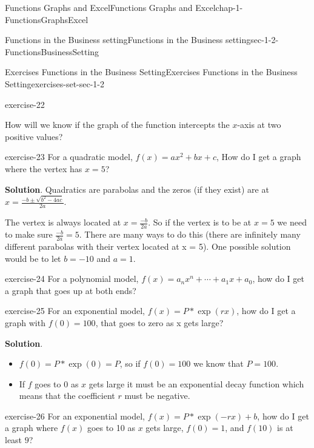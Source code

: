 \documentclass[oneside,10pt,]{book}
\numberwithin{equation}{section}
\begin{document}
\begin{chapterptx}{Functions Graphs and Excel}{}{Functions Graphs and Excel}{}{}{chap-1-FunctionsGraphsExcel}
\begin{sectionptx}{Functions in the Business setting}{}{Functions in the Business setting}{}{}{sec-1-2-FunctionsBusinessSetting}
\begin{exercises-subsection-numberless}{Exercises  Functions in the Business Setting}{}{Exercises  Functions in the Business Setting}{}{}{exercises-set-sec-1-2}
\begin{divisionexercise}{2}{}{}{exercise-22}
\begin{enumerate}[label=(\alph*)]
How will we know if the graph of the function intercepts the \(x\)-axis at two positive values?%
\end{enumerate}
%
\end{divisionexercise}%
\begin{divisionexercise}{3}{}{}{exercise-23}%
\hypertarget{p-179}{}%
For a quadratic model, \(f(x)=a x^2+b x+c\), How do I get a graph where the vertex has \(x=5\)?%
\par\smallskip%
\noindent\textbf{Solution}.\hypertarget{solution-12}{}\quad%
\hypertarget{p-180}{}%
Quadratics are parabolas and the zeros (if they exist) are at \(x=  \frac{-b\pm \sqrt{b^2-4ac}}{2a}\).%
\par
\hypertarget{p-181}{}%
The vertex is always located at \(x=  \frac{-b}{2a}\). So if the vertex is to be at \(x = 5\) we need to make sure \(\frac{-b}{2a}=5\). There are many ways to do this (there are infinitely many different parabolas with their vertex located at x = 5). One possible solution would be to let \(b = -10\) and \(a = 1\).%
\end{divisionexercise}%
\begin{divisionexercise}{4}{}{}{exercise-24}%
\hypertarget{p-182}{}%
For a polynomial model, \(f(x)=a_n x^n+\cdots+a_1 x+a_0\), how do I get a graph that goes up at both ends?%
\end{divisionexercise}%
\begin{divisionexercise}{5}{}{}{exercise-25}%
\hypertarget{p-183}{}%
For an exponential model, \(f(x)=P*\exp(r x)\), how do I get a graph with \(f(0)=100\), that goes to zero as x gets large?%
\par\smallskip%
\noindent\textbf{Solution}.\hypertarget{solution-13}{}\quad%
\leavevmode%
\begin{itemize}[label=\textbullet]
\item{}\hypertarget{p-184}{}%
\(f(0)=P*\exp(0)= P\), so if  \(f(0)=100\) we know that \(P=100\).%
\item{}\hypertarget{p-185}{}%
If \(f\) goes to 0 as \(x\) gets large it must be an exponential decay function which means that the coefficient \(r\) must be negative.%
\end{itemize}
\end{divisionexercise}%
\begin{divisionexercise}{6}{}{}{exercise-26}%
\hypertarget{p-186}{}%
For an exponential model, \(f(x)=P*\exp(-r x)+b\), how do I get a graph where \(f(x)\) goes to 10 as \(x\) gets large, \(f(0)=1\), and \(f(10)\) is at least \(9\)?%
\end{divisionexercise}%

\end{exercises-subsection-numberless}
\end{sectionptx}
\end{chapterptx}
\end{document}
